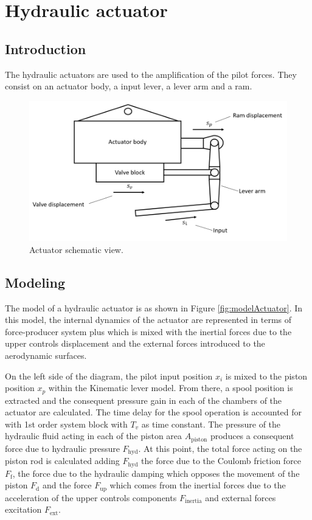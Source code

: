 \section{Hydraulic actuator}

\subsection{Introduction}

  The hydraulic actuators are used to the amplification of the pilot forces. They consist on an actuator body, a input lever, a lever arm and a ram. 

  \begin{figure}[!htpb]
    \centering
    \includegraphics[width=0.7 \textwidth]{figures/diagramActuator}
    \caption[Actuator schematic view]{Actuator schematic view.}
    \label{fig:diagramActuator}
  \end{figure}

\subsection{Modeling}

  The model of a hydraulic actuator is as shown in Figure \ref{fig:modelActuator}. In this model, the internal dynamics of the actuator are represented in terms of force-producer system plus which is mixed with the inertial forces due to the upper controls displacement and the external forces introduced to the aerodynamic surfaces.

  On the left side of the diagram, the pilot input position $x_i$ is mixed to the piston position $x_p$ within the Kinematic lever model. From there, a spool position is extracted and the consequent pressure gain in each of the chambers of the actuator are calculated. The time delay for the spool operation is accounted for with 1st order system block with $T_v$ as time constant. The pressure of the hydraulic fluid acting in each of the piston area $A_{\mathrm{piston}}$ produces a consequent force due to hydraulic pressure $F_{\mathrm{hyd}}$. At this point, the total force acting on the piston rod is calculated adding $F_{\mathrm{hyd}}$ the force due to the Coulomb friction force $F_{\mathrm{f}}$, the force due to the hydraulic damping which opposes the movement of the piston $F_{\mathrm{d}}$ and the force $F_{\mathrm{up}}$ which comes from the inertial forces due to the acceleration of the upper controls components $F_{\mathrm{inertia}}$ and external forces excitation $F_{\mathrm{ext}}$. 

